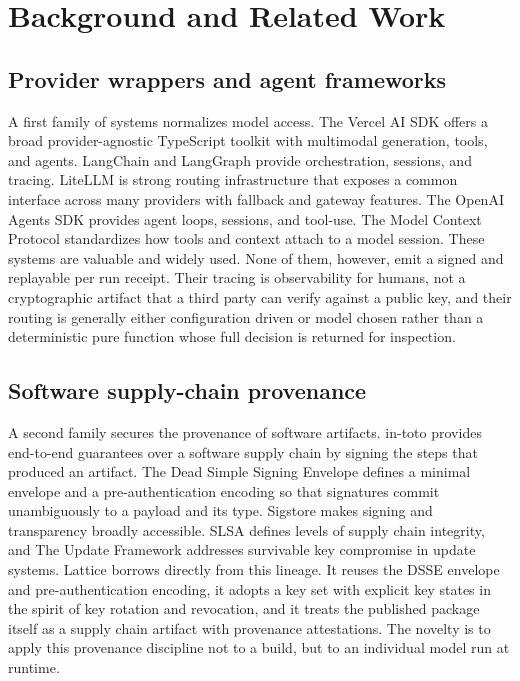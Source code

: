 \documentclass[conference]{IEEEtran}
\begin{document}
\section{Background and Related Work}

\subsection{Provider wrappers and agent frameworks}

A first family of systems normalizes model access. The Vercel AI SDK
\cite{vercelaisdk} offers a broad provider-agnostic TypeScript toolkit with
multimodal generation, tools, and agents. LangChain and LangGraph \cite{langchain}
provide orchestration, sessions, and tracing. LiteLLM \cite{litellm} is strong
routing infrastructure that exposes a common interface across many providers with
fallback and gateway features. The OpenAI Agents SDK \cite{openaiagents} provides
agent loops, sessions, and tool-use. The Model Context Protocol \cite{mcp}
standardizes how tools and context attach to a model session. These systems are
valuable and widely used. None of them, however, emit a signed and replayable per
run receipt. Their tracing is observability for humans, not a cryptographic artifact
that a third party can verify against a public key, and their routing is generally
either configuration driven or model chosen rather than a deterministic pure
function whose full decision is returned for inspection.

\subsection{Software supply-chain provenance}

A second family secures the provenance of software artifacts. in-toto
\cite{intoto} provides end-to-end guarantees over a software supply chain by signing
the steps that produced an artifact. The Dead Simple Signing Envelope \cite{dsse}
defines a minimal envelope and a pre-authentication encoding so that signatures
commit unambiguously to a payload and its type. Sigstore \cite{sigstore} makes
signing and transparency broadly accessible. SLSA \cite{slsa} defines levels of
supply chain integrity, and The Update Framework \cite{tuf} addresses survivable key
compromise in update systems. Lattice borrows directly from this lineage. It reuses
the DSSE envelope and pre-authentication encoding, it adopts a key set with explicit
key states in the spirit of key rotation and revocation, and it treats the published
package itself as a supply chain artifact with provenance attestations. The novelty
is to apply this provenance discipline not to a build, but to an individual model run
at runtime.
\end{document}
